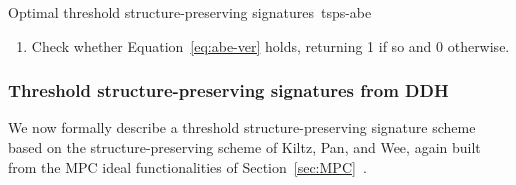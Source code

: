 \begin{protocolbox}{Optimal threshold structure-preserving
  signatures~\cite{C:AGHO11}}{tsps-abe}
\begin{description}
    \begin{enumerate}

      \item Check whether Equation~\ref{eq:abe-ver} holds, returning 1 if so
        and 0 otherwise.

    \end{enumerate}

\end{description}

\end{protocolbox}

\subsubsection{Threshold structure-preserving signatures from
DDH~\cite{C:KilPanWee15}}\label{sec:tsps-kiltz}

We now formally describe a threshold structure-preserving signature scheme
based on the structure-preserving scheme of Kiltz, Pan, and Wee, again built
from the MPC ideal functionalities of
Section~\ref{sec:MPC}~\cite{C:KilPanWee15}.

